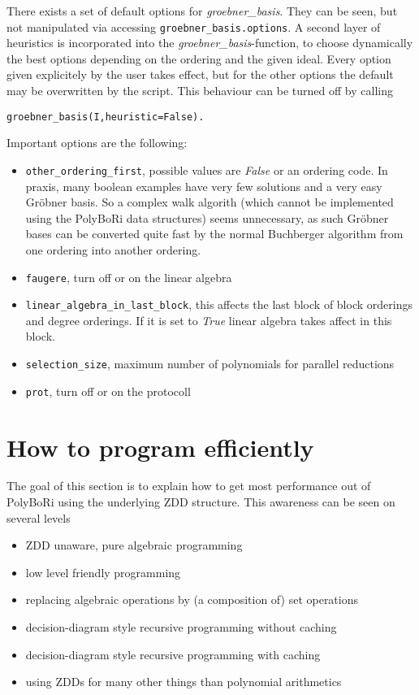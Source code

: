 \documentclass[]{article}
\newcommand{\PolyBoRi}{{\sc PolyBoRi}\xspace}
\newcommand{\Groebner}{Gröbner\xspace}
\newcommand{\functionname}[1]{\textit{#1}\xspace}
\newcommand{\pythonconstant}[1]{\textit{#1}\xspace}
\begin{document}
There exists a set of default options for \functionname{groebner\_basis}.
They can be seen, but not manipulated via accessing \verb|groebner_basis.options|.
A second layer of heuristics is incorporated into the \functionname{groebner\_basis}-function, to choose dynamically the best options depending on the ordering and the given ideal.
Every option given explicitely by the user takes effect, but for the other options the default may be overwritten by the script.
This behaviour can be turned off by calling
\begin{verbatim}
groebner_basis(I,heuristic=False).
\end{verbatim}

Important options are the following:
\begin{itemize}
    \item \verb|other_ordering_first|, possible values are \pythonconstant{False} or an ordering code.
    In praxis, many boolean examples have very few solutions and a very easy \Groebner basis. So a complex walk algorith (which cannot be implemented using the \PolyBoRi data structures) seems unnecessary, as such \Groebner bases can be converted quite fast by the 
    normal Buchberger algorithm from one ordering into another ordering.
    \item \verb|faugere|, turn off or on the linear algebra
    \item \verb|linear_algebra_in_last_block|, this affects the last block of block orderings and degree orderings. If it is set to \pythonconstant{True} linear algebra takes affect in this block.
    \item \verb|selection_size|, maximum number of polynomials for parallel reductions
    \item \verb|prot|, turn off or on the protocoll
\end{itemize}
\section{How to program efficiently}
The goal of this section is to explain how to get most performance out of \PolyBoRi using the underlying ZDD structure.
This awareness can be seen on several levels
\begin{itemize}
    \item ZDD unaware, pure algebraic programming 
    \item low level friendly programming
    \item replacing algebraic operations by (a composition of) set operations
    \item decision-diagram style recursive programming without caching
    \item decision-diagram style recursive programming with caching
    \item using ZDDs for many other things than polynomial arithmetics
\end{itemize}
\end{document}
